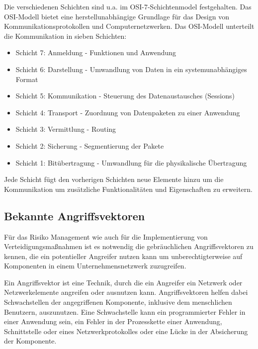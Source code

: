 Die verschiedenen Schichten sind u.a. im OSI-7-Schichtenmodel festgehalten.
Das OSI-Modell bietet eine herstellunabhängige Grundlage für das Design von Kommunikationsprotokollen und Computernetzwerken. Das OSI-Modell unterteilt die Kommunikation in sieben Schichten:
\begin{itemize}
\item Schicht 7: Anmeldung - Funktionen und Anwendung
\item Schicht 6: Darstellung - Umwandlung von Daten in ein systemunabhängiges Format
\item Schicht 5: Kommunikation - Steuerung des Datenaustausches (Sessions)
\item Schicht 4: Transport - Zuordnung von Datenpaketen zu einer Anwendung
\item Schicht 3: Vermittlung - Routing
\item Schicht 2: Sicherung - Segmentierung der Pakete 
\item Schicht 1: Bitübertragung - Umwandlung für die physikalische Übertragung
\end{itemize}

Jede Schicht fügt den vorherigen Schichten neue Elemente hinzu um die Kommunikation um zusätzliche Funktionalitäten und Eigenschaften zu erweitern. 



\subsection{Bekannte Angriffsvektoren}
Für das Risiko Management wie auch für die Implementierung von Verteidigungsmaßnahmen ist es notwendig die gebräuchlichen Angriffsvektoren zu kennen, die ein potentieller Angreifer nutzen kann um unberechtigterweise auf Komponenten in einem Unternehmensnetzwerk zuzugreifen. 

Ein Angriffsvektor ist eine Technik, durch die ein Angreifer ein Netzwerk oder Netzwerkelemente angreifen oder ausnutzen kann. Angriffsvektoren helfen dabei Schwachstellen der angegriffenen Komponente, inklusive dem menschlichen Benutzern, auszunutzen. Eine Schwachstelle kann ein programmierter Fehler in einer Anwendung sein, ein Fehler in der Prozesskette einer Anwendung, Schnittstelle oder eines Netzwerkprotokolles oder eine Lücke in der Absicherung der Komponente. 

